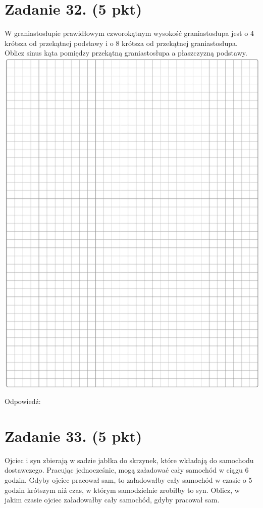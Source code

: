 \documentclass[10pt]{article}
\begin{document}
\section*{Zadanie 32. (5 pkt)}
W graniastosłupie prawidłowym czworokątnym wysokość graniastosłupa jest o 4 krótsza od przekątnej podstawy i o 8 krótsza od przekątnej graniastosłupa. Oblicz sinus kąta pomiędzy przekątną graniastosłupa a płaszczyzną podstawy.\\
\includegraphics[max width=\textwidth, center]{2024_11_21_769d5953f978b92e06f5g-14}

Odpowiedź:

\section*{Zadanie 33. (5 pkt)}
Ojciec i syn zbierają w sadzie jabłka do skrzynek, które wkładają do samochodu dostawczego. Pracując jednocześnie, mogą załadować cały samochód w ciągu 6 godzin. Gdyby ojciec pracował sam, to załadowałby cały samochód w czasie o 5 godzin krótszym niż czas, w którym samodzielnie zrobiłby to syn. Oblicz, w jakim czasie ojciec załadowałby cały samochód, gdyby pracował sam.
\end{document}
